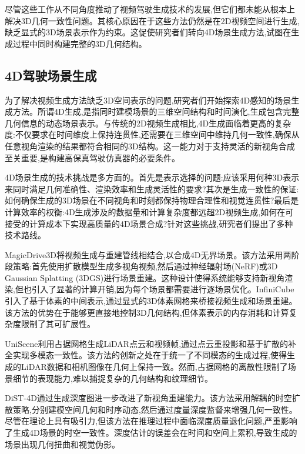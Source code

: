 尽管这些工作从不同角度推动了视频驾驶生成技术的发展,但它们都未能从根本上解决3D几何一致性问题。其核心原因在于这些方法仍然是在2D视频空间进行生成,缺乏显式的3D场景表示作为约束。这促使研究者们转向4D场景生成方法,试图在生成过程中同时构建完整的3D几何结构。

\subsection{4D驾驶场景生成}

为了解决视频生成方法缺乏3D空间表示的问题,研究者们开始探索4D感知的场景生成方法。所谓4D生成,是指同时建模场景的三维空间结构和时间演化,生成包含完整几何信息的动态场景表示。与传统的2D视频生成相比,4D生成面临着更高的复杂度:不仅要求在时间维度上保持连贯性,还需要在三维空间中维持几何一致性,确保从任意视角渲染的结果都符合相同的3D结构。这一能力对于支持灵活的新视角合成至关重要,是构建高保真驾驶仿真器的必要条件。

4D场景生成的技术挑战是多方面的。首先是表示选择的问题:应该采用何种3D表示来同时满足几何准确性、渲染效率和生成灵活性的要求?其次是生成一致性的保证:如何确保生成的3D场景在不同视角和时刻都保持物理合理性和视觉连贯性?最后是计算效率的权衡:4D生成涉及的数据量和计算复杂度都远超2D视频生成,如何在可接受的计算成本下实现高质量的4D场景合成?针对这些挑战,研究者们提出了多种技术路线。

MagicDrive3D\cite{gao2024magicdrive3d}将视频生成与重建管线相结合,以合成4D无界场景。该方法采用两阶段策略:首先使用扩散模型生成多视角视频,然后通过神经辐射场(NeRF)或3D Gaussian Splatting (3DGS)进行场景重建。这种设计使得系统能够支持新视角渲染,但也引入了显著的计算开销,因为每个场景都需要进行逐场景优化。InfiniCube\cite{lu2024infinicube}引入了基于体素的中间表示,通过显式的3D体素网格来桥接视频生成和场景重建。该方法的优势在于能够更直接地控制3D几何结构,但体素表示的内存消耗和计算复杂度限制了其可扩展性。

UniScene\cite{li2025uniscene}利用占据网格生成LiDAR点云和视频帧,通过点云重投影和基于扩散的补全实现多模态一致性。该方法的创新之处在于统一了不同模态的生成过程,使得生成的LiDAR数据和相机图像在几何上保持一致。然而,占据网格的离散性限制了场景细节的表现能力,难以捕捉复杂的几何结构和纹理细节。

DiST-4D\cite{guo2025dist4d}通过生成深度图进一步改进了新视角重建能力。该方法采用解耦的时空扩散策略,分别建模空间几何和时序动态,然后通过度量深度监督来增强几何一致性。尽管在理论上具有吸引力,但该方法在推理过程中面临深度质量退化问题,严重影响了生成4D场景的时空一致性。深度估计的误差会在时间和空间上累积,导致生成的场景出现几何扭曲和视觉伪影。

